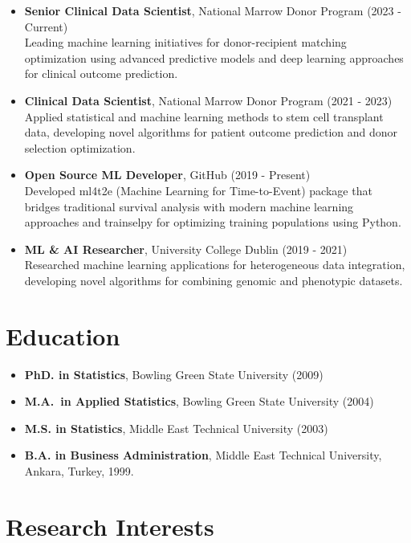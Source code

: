 \documentclass[11pt,a4paper,]{moderncv}
\providecommand{\tightlist}{%
	\setlength{\itemsep}{0pt}\setlength{\parskip}{0pt}}
\begin{document}
\begin{itemize}
\tightlist
\item
  \textbf{Senior Clinical Data Scientist}, National Marrow Donor Program
  (2023 - Current)\\
  Leading machine learning initiatives for donor-recipient matching
  optimization using advanced predictive models and deep learning
  approaches for clinical outcome prediction.
\item
  \textbf{Clinical Data Scientist}, National Marrow Donor Program (2021
  - 2023)\\
  Applied statistical and machine learning methods to stem cell
  transplant data, developing novel algorithms for patient outcome
  prediction and donor selection optimization.
\item
  \textbf{Open Source ML Developer}, GitHub (2019 - Present)\\
  Developed ml4t2e (Machine Learning for Time-to-Event) package that
  bridges traditional survival analysis with modern machine learning
  approaches and trainselpy for optimizing training populations using
  Python.
\item
  \textbf{ML \& AI Researcher}, University College Dublin (2019 -
  2021)\\
  Researched machine learning applications for heterogeneous data
  integration, developing novel algorithms for combining genomic and
  phenotypic datasets.
\end{itemize}

\section{Education}\label{education}

\begin{itemize}
\tightlist
\item
  \textbf{PhD. in Statistics}, Bowling Green State University (2009)
\item
  \textbf{M.A.~in Applied Statistics}, Bowling Green State University
  (2004)
\item
  \textbf{M.S. in Statistics}, Middle East Technical University (2003)
\item
  \textbf{B.A. in Business Administration}, Middle East Technical
  University, Ankara, Turkey, 1999.
\end{itemize}

\section{Research Interests}\label{research-interests}
\end{document}
